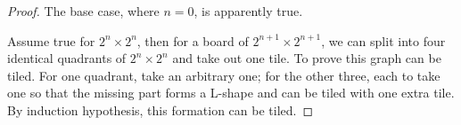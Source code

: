 \begin{proof}

The base case, where $n = 0$, is apparently true.

Assume true for $2^n \times 2^n$, then for a board of $2^{n + 1} \times 2^{n + 1}$, we can split into four identical quadrants of $2^n \times 2^n$ and take out one tile. To prove this graph can be tiled. For one quadrant, take an arbitrary one; for the other three, each to take one so that the missing part forms a L-shape and can be tiled with one extra tile. By induction hypothesis, this formation can be tiled.

\end{proof}


